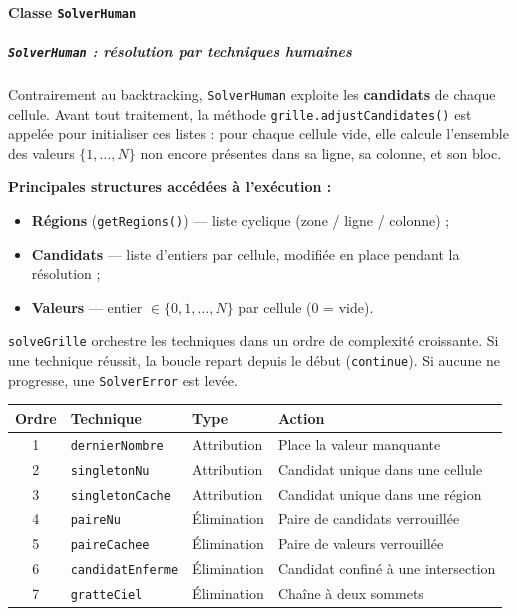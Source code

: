 \documentclass[a4paper]{article}
\begin{document}

\paragraph{Classe \texttt{SolverHuman}}

\subparagraph{\texttt{SolverHuman} : résolution par techniques humaines}

Contrairement au backtracking, \texttt{SolverHuman} exploite les \textbf{candidats} de chaque
cellule. Avant tout traitement, la méthode \texttt{grille.adjustCandidates()} est appelée
pour initialiser ces listes : pour chaque cellule vide, elle calcule l'ensemble des valeurs
$\{1, \ldots, N\}$ non encore présentes dans sa ligne, sa colonne, et son bloc.

\medskip
\textbf{Principales structures accédées à l'exécution :}

\begin{itemize}[noitemsep]
  \item \textbf{Régions} (\texttt{getRegions()}) — liste cyclique (zone / ligne / colonne) ;
  \item \textbf{Candidats} — liste d'entiers par cellule, modifiée en place pendant la résolution ;
  \item \textbf{Valeurs} — entier $\in \{0, 1, \ldots, N\}$ par cellule ($0$ = vide).
\end{itemize}

\texttt{solveGrille} orchestre les techniques dans un ordre de complexité croissante.
Si une technique réussit, la boucle repart depuis le début (\texttt{continue}).
Si aucune ne progresse, une \texttt{SolverError} est levée.

\begin{center}
\renewcommand{\arraystretch}{1.3}
\begin{tabular}{clll}
  \toprule
  \textbf{Ordre} & \textbf{Technique} & \textbf{Type} & \textbf{Action} \\
  \midrule
  1 & \texttt{dernierNombre}    & Attribution & Place la valeur manquante \\
  2 & \texttt{singletonNu}      & Attribution & Candidat unique dans une cellule \\
  3 & \texttt{singletonCache}   & Attribution & Candidat unique dans une région \\
  4 & \texttt{paireNu}          & Élimination & Paire de candidats verrouillée \\
  5 & \texttt{paireCachee}      & Élimination & Paire de valeurs verrouillée \\
  6 & \texttt{candidatEnferme}  & Élimination & Candidat confiné à une intersection \\
  7 & \texttt{gratteCiel}       & Élimination & Chaîne à deux sommets \\
  \bottomrule
\end{tabular}
\end{center}
\end{document}
